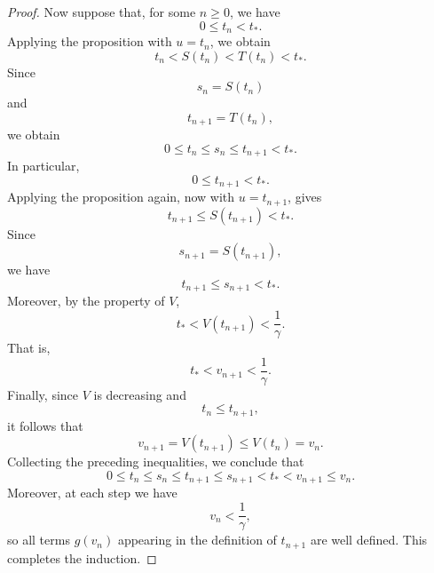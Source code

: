 \documentclass[11pt,a4paper]{article}
\numberwithin{equation}{section}
\numberwithin{table}{section}
\theoremstyle{plain}
\theoremstyle{definition}\newtheorem{definition}[theorem]{Definition}
\theoremstyle{remark}\newtheorem{remark}[theorem]{Remark}
\begin{document}
\begin{proof}
Now suppose that, for some $n\geq0$, we have 
\begin{equation*}
0\leq t_n<t_*.
\end{equation*}
Applying the proposition with $u=t_n$, we obtain 
\begin{equation*}
t_n<S(t_n)<T(t_n)<t_*.
\end{equation*}
Since 
\begin{equation*}
s_n=S(t_n)
\end{equation*}
and 
\begin{equation*}
t_{n+1}=T(t_n),
\end{equation*}
we obtain 
\begin{equation*}
0\leq t_n\leq s_n\leq t_{n+1}<t_*.
\end{equation*}
In particular, 
\begin{equation*}
0\leq t_{n+1}<t_*.
\end{equation*}
Applying the proposition again, now with $u=t_{n+1}$, gives 
\begin{equation*}
t_{n+1}\leq S(t_{n+1})<t_*.
\end{equation*}
Since 
\begin{equation*}
s_{n+1}=S(t_{n+1}),
\end{equation*}
we have 
\begin{equation*}
t_{n+1}\leq s_{n+1}<t_*.
\end{equation*}
Moreover, by the property of $V$, 
\begin{equation*}
t_*<V(t_{n+1})<\frac1\gamma.
\end{equation*}
That is, 
\begin{equation*}
t_*<v_{n+1}<\frac1\gamma.
\end{equation*}
Finally, since $V$ is decreasing and 
\begin{equation*}
t_n\leq t_{n+1},
\end{equation*}
it follows that 
\begin{equation*}
v_{n+1}=V(t_{n+1})\leq V(t_n)=v_n.
\end{equation*}
Collecting the preceding inequalities, we conclude that 
\begin{equation*}
0\leq t_n\leq s_n\leq t_{n+1}\leq s_{n+1}<t_*<v_{n+1}\leq v_n.
\end{equation*}
Moreover, at each step we have 
\begin{equation*}
v_n<\frac1\gamma,
\end{equation*}
so all terms $g(v_n)$ appearing in the definition of $t_{n+1}$ are
well defined. This completes the induction.
\end{proof}
\end{document}
